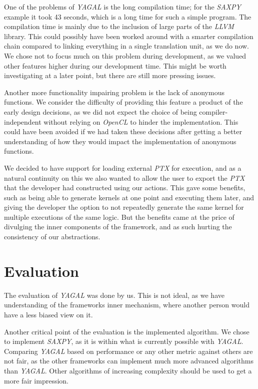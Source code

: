One of the problems of \textit{YAGAL} is the long compilation time; for the \textit{SAXPY} example it took 43 seconds, which is a long time for such a simple program. The compilation time is mainly due to the inclusion of large parts of the \textit{LLVM} library. This could possibly have been worked around with a smarter compilation chain compared to linking everything in a single translation unit, as we do now. We chose not to focus much on this problem during development, as we valued other features higher during our development time. This might be worth investigating at a later point, but there are still more pressing issues.

Another more functionality impairing problem is the lack of anonymous functions. We consider the difficulty of providing this feature a product of the early design decisions, as we did not expect the choice of being compiler-independent without relying on \textit{OpenCL} to hinder the implementation. This could have been avoided if we had taken these decisions after getting a better understanding of how they would impact the implementation of anonymous functions.

We decided to have support for loading external \textit{PTX} for execution, and as a natural continuity on this we also wanted to allow the user to export the \textit{PTX} that the developer had constructed using our actions. This gave some benefits, such as being able to generate kernels at one point and executing them later, and giving the developer the option to not repeatedly generate the same kernel for multiple executions of the same logic. But the benefits came at the price of divulging the inner components of the framework, and as such hurting the consistency of our abstractions.

\section{Evaluation}
The evaluation of \textit{YAGAL} was done by us. This is not ideal, as we have understanding of the frameworks inner mechanism, where another person would have a less biased view on it. 

Another critical point of the evaluation is the implemented algorithm. We chose to implement \textit{SAXPY}, as it is within what is currently possible with \textit{YAGAL}. Comparing \textit{YAGAL} based on performance or any other metric against others are not fair, as the other frameworks can implement much more advanced algorithms than \textit{YAGAL}. Other algorithms of increasing complexity should be used to get a more fair impression.

